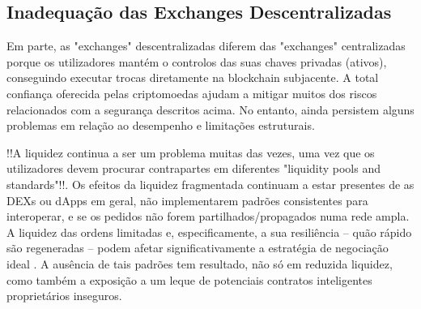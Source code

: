 \documentclass[UTF8,nofonts]{article}
\begin{document}
\begin{multicols}{2}
\subsection{Inadequação das Exchanges Descentralizadas}
Em parte, as "exchanges" descentralizadas diferem das "exchanges" centralizadas porque os utilizadores mantém o controlos das suas chaves privadas (ativos), conseguindo executar trocas diretamente na blockchain subjacente. A total confiança oferecida pelas criptomoedas ajudam a mitigar muitos dos riscos relacionados com a segurança descritos acima. No entanto, ainda persistem alguns problemas em relação ao desempenho e limitações estruturais.

!!A liquidez continua a ser um problema muitas das vezes, uma vez que os utilizadores devem procurar contrapartes em diferentes "liquidity pools and standards"!!. Os efeitos da liquidez fragmentada continuam a estar presentes de as DEXs ou dApps em geral, não implementarem padrões consistentes para interoperar, e se os pedidos não forem partilhados/propagados numa rede ampla. A liquidez das ordens limitadas e, especificamente, a sua resiliência -- quão rápido são regeneradas -- podem afetar significativamente a estratégia de negociação ideal \cite{limitorderliquidity}. A ausência de tais padrões tem resultado, não só em reduzida liquidez, como também a exposição a um leque de potenciais contratos inteligentes proprietários inseguros.


\end{multicols}
\end{document}
